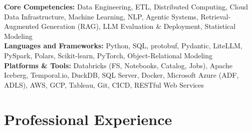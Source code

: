 \documentclass[10pt,a4paper]{article}
\begin{document}
\textbf{Core Competencies:} Data Engineering, ETL, Distributed Computing, Cloud Data Infrastructure, Machine Learning, NLP, Agentic Systems, Retrieval-Augmented Generation (RAG), LLM Evaluation \& Deployment, Statistical Modeling \\
\textbf{Languages and Frameworks:} Python, SQL, protobuf, Pydantic, LiteLLM, PySpark, Polars, Scikit-learn, PyTorch, Object-Relational Modeling \\
\textbf{Platforms \& Tools:} Databricks (FS, Notebooks, Catalog, Jobs), Apache Iceberg, Temporal.io, DuckDB, SQL Server, Docker, Microsoft Azure (ADF, ADLS), AWS, GCP, Tableau, Git, CICD, RESTful Web Services



\section*{Professional Experience}
\end{document}

